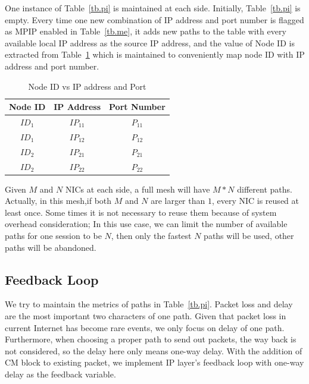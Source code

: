 One instance of Table~\ref{tb.pi} is maintained at each side. Initially, Table~\ref{tb.pi} is empty. Every time one new combination of IP address and port number is flagged as MPIP enabled in Table~\ref{tb.me}, it adds new paths to the table with every available local IP address as the source IP address, and the value of Node ID is extracted from Table~\ref{tb.wi} which is maintained to conveniently map node ID with IP address and port number. 


\begin{table}[htbp]
\caption{\label{tb.wi}Node ID vs IP address and Port}
\centering
\begin{tabular}{|c|c|c|}
\hline
 Node ID  & IP Address & Port Number\\
\hline
${ID}_{1}$&${IP}_{11}$&${P}_{11}$ \\
\hline
${ID}_{1}$&${IP}_{12}$&${P}_{12}$ \\
\hline
${ID}_{2}$&${IP}_{21}$&${P}_{21}$ \\
\hline
${ID}_{2}$&${IP}_{22}$&${P}_{22}$ \\
\hline
\end{tabular}
\end{table}

Given $M$ and $N$ NICs at each side, a full mesh will have $M*N$ different paths. Actually, in this mesh,if both $M$ and $N$ are larger than $1$, every NIC is reused at least once. Some times it is not necessary to reuse them because of system overhead consideration; In this use case, we can limit the number of available paths for one session to be $N$, then only the fastest $N$ paths will be used, other paths will be abandoned. 

\subsection{Feedback Loop}

We try to maintain the metrics of paths in Table~\ref{tb.pi}. Packet loss and delay are the most important two characters of one path. Given that packet loss in current Internet has become rare events, we only focus on delay of one path. Furthermore, when choosing a proper path to send out packets, the way back is not considered, so the delay here only means one-way delay. With the addition of CM block to existing packet, we implement IP layer's feedback loop with one-way delay as the feedback variable. 


